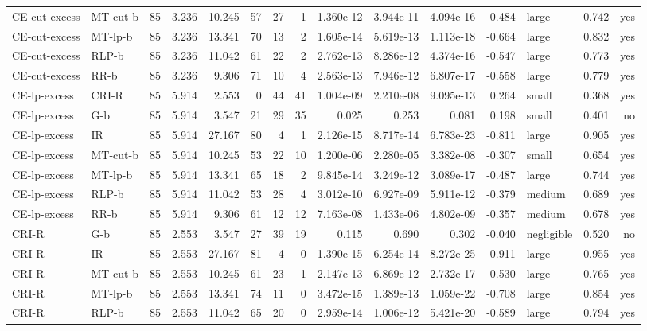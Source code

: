 \begin{table}[htbp]
\begin{tabular}{llrrrrrrrrrrlrr}
CE-cut-excess & MT-cut-b & 85 & 3.236 & 10.245 & 57 & 27 & 1 & 1.360e-12 & 3.944e-11 & 4.094e-16 & -0.484 & large & 0.742 & yes \\
CE-cut-excess & MT-lp-b & 85 & 3.236 & 13.341 & 70 & 13 & 2 & 1.605e-14 & 5.619e-13 & 1.113e-18 & -0.664 & large & 0.832 & yes \\
CE-cut-excess & RLP-b & 85 & 3.236 & 11.042 & 61 & 22 & 2 & 2.762e-13 & 8.286e-12 & 4.374e-16 & -0.547 & large & 0.773 & yes \\
CE-cut-excess & RR-b & 85 & 3.236 & 9.306 & 71 & 10 & 4 & 2.563e-13 & 7.946e-12 & 6.807e-17 & -0.558 & large & 0.779 & yes \\
CE-lp-excess & CRI-R & 85 & 5.914 & 2.553 & 0 & 44 & 41 & 1.004e-09 & 2.210e-08 & 9.095e-13 & 0.264 & small & 0.368 & yes \\
CE-lp-excess & G-b & 85 & 5.914 & 3.547 & 21 & 29 & 35 & 0.025 & 0.253 & 0.081 & 0.198 & small & 0.401 & no \\
CE-lp-excess & IR & 85 & 5.914 & 27.167 & 80 & 4 & 1 & 2.126e-15 & 8.717e-14 & 6.783e-23 & -0.811 & large & 0.905 & yes \\
CE-lp-excess & MT-cut-b & 85 & 5.914 & 10.245 & 53 & 22 & 10 & 1.200e-06 & 2.280e-05 & 3.382e-08 & -0.307 & small & 0.654 & yes \\
CE-lp-excess & MT-lp-b & 85 & 5.914 & 13.341 & 65 & 18 & 2 & 9.845e-14 & 3.249e-12 & 3.089e-17 & -0.487 & large & 0.744 & yes \\
CE-lp-excess & RLP-b & 85 & 5.914 & 11.042 & 53 & 28 & 4 & 3.012e-10 & 6.927e-09 & 5.911e-12 & -0.379 & medium & 0.689 & yes \\
CE-lp-excess & RR-b & 85 & 5.914 & 9.306 & 61 & 12 & 12 & 7.163e-08 & 1.433e-06 & 4.802e-09 & -0.357 & medium & 0.678 & yes \\
CRI-R & G-b & 85 & 2.553 & 3.547 & 27 & 39 & 19 & 0.115 & 0.690 & 0.302 & -0.040 & negligible & 0.520 & no \\
CRI-R & IR & 85 & 2.553 & 27.167 & 81 & 4 & 0 & 1.390e-15 & 6.254e-14 & 8.272e-25 & -0.911 & large & 0.955 & yes \\
CRI-R & MT-cut-b & 85 & 2.553 & 10.245 & 61 & 23 & 1 & 2.147e-13 & 6.869e-12 & 2.732e-17 & -0.530 & large & 0.765 & yes \\
CRI-R & MT-lp-b & 85 & 2.553 & 13.341 & 74 & 11 & 0 & 3.472e-15 & 1.389e-13 & 1.059e-22 & -0.708 & large & 0.854 & yes \\
CRI-R & RLP-b & 85 & 2.553 & 11.042 & 65 & 20 & 0 & 2.959e-14 & 1.006e-12 & 5.421e-20 & -0.589 & large & 0.794 & yes \\

\end{tabular}
\end{table}
